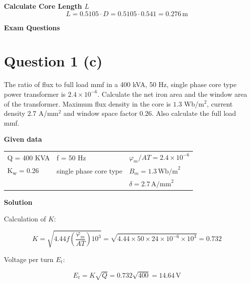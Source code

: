 \documentclass[12pt]{article}
\begin{document}
\textbf{Calculate Core Length \( L \)}
\[
L = 0.5105 \cdot D = 0.5105 \cdot 0.541 = 0.276\, \text{m}
\]



\newpage

\begin{center}
	\textbf{\LARGE Exam Questions}
\end{center}

\bigskip

\section*{Question 1 (c)}

\noindent
The ratio of flux to full load mmf in a 400 kVA, 50 Hz, single phase core type power transformer is $2.4 \times 10^{-6}$. Calculate the net iron area and the window area of the transformer. Maximum flux density in the core is $1.3$ Wb/m$^2$, current density $2.7$ A/mm$^2$ and window space factor $0.26$. Also calculate the full load mmf.

\vspace{10pt}

\noindent
\textbf{Given data}

\vspace{5pt}

\begin{center}
	\begin{tabular}{>{\raggedright\arraybackslash}p{4cm} >{\raggedright\arraybackslash}p{4cm} >{\raggedright\arraybackslash}p{5cm}}
		Q = 400 KVA & f = 50 Hz & $\varphi_m/AT = 2.4 \times 10^{-6}$ \\
		K\textsubscript{w} = 0.26 & single phase core type & $B_m = 1.3 \, \text{Wb/m}^2$ \\
		& & $\delta = 2.7 \, \text{A/mm}^2$
	\end{tabular}
\end{center}

\vspace{10pt}

\noindent
\textbf{Solution}

\vspace{5pt}

Calculation of $K$:

\[
K = \sqrt{4.44 f \left( \frac{\varphi_m}{AT} \right) 10^3} = \sqrt{4.44 \times 50 \times 24 \times 10^{-6} \times 10^3} = 0.732
\]

Voltage per turn $E_t$:

\[
E_t = K \sqrt{Q} = 0.732 \sqrt{400} = 14.64 \, \text{V}
\]
\end{document}

